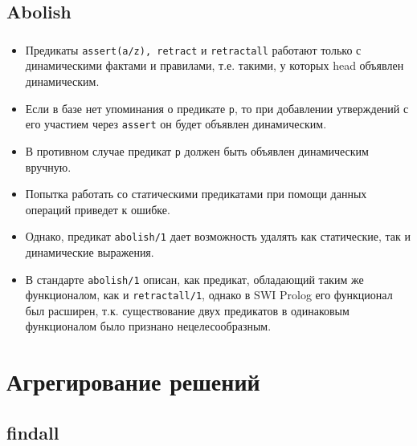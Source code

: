 

\subsection{Abolish}

\begin{frame}

	\frametitle{\insertsection}
	\framesubtitle{\insertsubsection}
	
	\begin{itemize}
		\item Предикаты \texttt{assert(a/z), retract} и \texttt{retractall} работают только с \alert{динамическими фактами и правилами}, т.е. такими, у которых head объявлен динамическим.
		\item Если в базе нет упоминания о предикате \texttt{p}, то при добавлении утверждений с его участием через \texttt{assert} он будет объявлен динамическим.
		\item В противном случае предикат \texttt{p} должен быть объявлен динамическим вручную.
		\item Попытка работать со статическими предикатами при помощи данных операций приведет к ошибке.
		\item Однако, предикат \texttt{abolish/1} дает возможность удалять как статические, так и динамические выражения.
		\item В стандарте \texttt{abolish/1} описан, как предикат, обладающий таким же функционалом, как и \texttt{retractall/1}, однако в SWI Prolog его функционал был расширен, т.к. существование двух предикатов в одинаковым функционалом было признано нецелесообразным.
	\end{itemize}

\end{frame}


\section{Агрегирование решений}
\subsection{findall}

\begin{frame}

	\begin{center}
		\Huge \insertsection
	\end{center}

\end{frame}